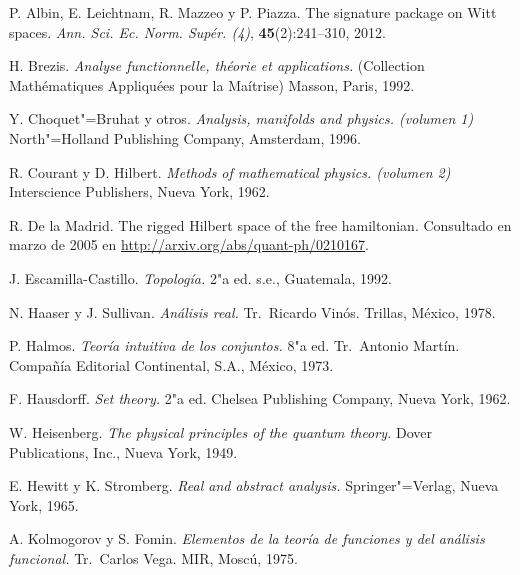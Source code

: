 \begin{thebibliography}{99}

 P. Albin, E. Leichtnam, R. Mazzeo y P. Piazza. The signature package on Witt spaces. \textit{Ann. Sci. Ec. Norm. Supér. (4)}, \textbf{45}(2):241--310, 2012.

 H. Brezis. \textit{Analyse functionnelle, théorie et applications.} (Collection Mathématiques Appliquées pour la Maítrise) Masson, Paris, 1992.

 Y. Choquet"=Bruhat y otros. \textit{Analysis, manifolds and physics. (volumen 1)} North"=Holland Publishing Company, Amsterdam, 1996.

 R. Courant y {D. Hilbert}. \textit{Methods of mathematical physics. (volumen 2)} Interscience Publishers, Nueva York, 1962.

 R. {De la Madrid}. The rigged {Hilbert} space of the free hamiltonian. Consultado en marzo de 2005 en \url{http://arxiv.org/abs/quant-ph/0210167}.

 J. Escamilla-Castillo. \textit{Topología.} 2"a ed. s.e., Guatemala, 1992.

 N. Haaser y {J. Sullivan}. \textit{Análisis real.}  Tr.~Ricardo Vinós. Trillas, México, 1978.

 P. Halmos. \textit{Teoría intuitiva de los conjuntos.} 8"a ed. Tr.~Antonio Martín. Compañía Editorial Continental, S.A., México, 1973.

 F. Hausdorff. \textit{Set theory.} 2"a ed. Chelsea Publishing Company, Nueva York, 1962.

 W. Heisenberg. \textit{The physical principles of the quantum theory.} Dover Publications, Inc., Nueva York, 1949.

 E. Hewitt y {K. Stromberg}. \textit{Real and abstract analysis.} Springer"=Verlag, Nueva York, 1965.

 A. Kolmogorov y {S. Fomin}. \textit{Elementos de la teoría de funciones y del análisis funcional.} Tr.~Carlos Vega. MIR, Moscú, 1975.


\end{thebibliography}
